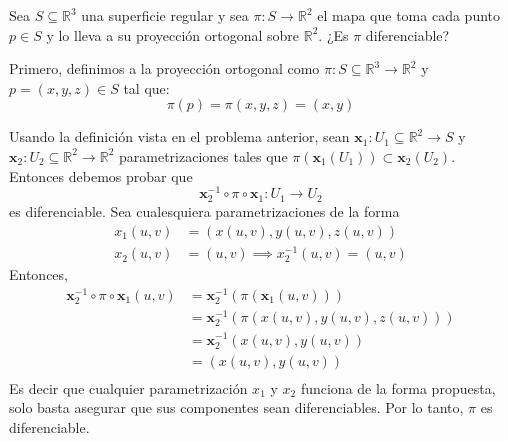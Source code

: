 \begin{problema}
    Sea $S \subseteq \mathbb{R}^3$ una superficie regular y sea $\pi: S \rightarrow \mathbb{R}^2$ el mapa que toma cada punto $p \in S$ y lo lleva a su proyección ortogonal sobre $\mathbb{R}^2$. ¿Es $\pi$ diferenciable?
    \begin{sol}
        Primero, definimos a la proyección ortogonal como $\pi:S\subseteq\mathbb{R}^3\to \mathbb{R}^2$ y $p=(x,y,z)\in S$ tal que: 
        $$\pi(p)=\pi(x,y,z)=(x,y)$$

        Usando la definición vista en el problema anterior, sean $\mathbf{x}_1:U_1\subseteq \mathbb{R}^2\to S$ y $\mathbf{x}_2:U_2\subseteq\mathbb{R}^2\to \mathbb{R}^2$ parametrizaciones tales que $\pi(\mathbf{x}_1(U_1))\subset \mathbf{x}_2(U_2)$. Entonces debemos probar que $$ \mathbf{x}_2^{-1}\circ \pi \circ \mathbf{x}_1:U_1\to U_2 $$ es diferenciable. Sea cualesquiera parametrizaciones de la forma
        \begin{align*}
            x_1(u,v) &= (x(u,v),y(u,v),z(u,v))\\
            x_2(u,v) &= (u,v) \implies x_2^{-1}(u,v) = (u,v)
        \end{align*}
        Entonces, 
        \begin{align*}
            \mathbf{x}_2^{-1}\circ \pi \circ \mathbf{x}_1(u,v) &=  \mathbf{x}_2^{-1}(\pi (\mathbf{x}_1(u,v)))\\
            &= \mathbf{x}_2^{-1}(\pi (x(u,v),y(u,v),z(u,v)))\\
            &= \mathbf{x}_2^{-1}(x(u,v),y(u,v))\\
            &=(x(u,v),y(u,v))\\
        \end{align*}
        Es decir que cualquier parametrización $x_1$ y $x_2$ funciona de la forma propuesta, solo basta asegurar que sus componentes sean diferenciables. Por lo tanto, $\pi$ es diferenciable. 
    \end{sol}
\end{problema}

